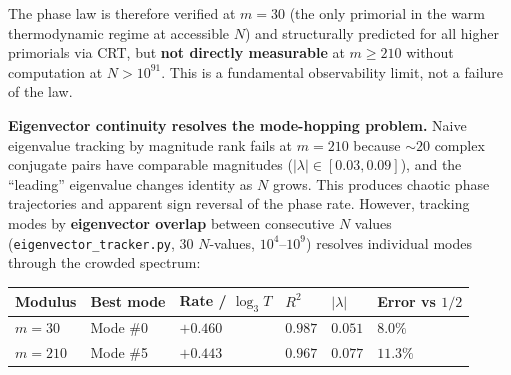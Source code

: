 \documentclass[
  11pt,
]{article}
\newcounter{none} %
\numberwithin{equation}{section}
\begin{document}
The phase law is therefore verified at \(m = 30\) (the only primorial in
the warm thermodynamic regime at accessible \(N\)) and structurally
predicted for all higher primorials via CRT, but \textbf{not directly
measurable} at \(m \geq 210\) without computation at \(N > 10^{91}\).
This is a fundamental observability limit, not a failure of the law.

\textbf{Eigenvector continuity resolves the mode-hopping problem.} Naive
eigenvalue tracking by magnitude rank fails at \(m = 210\) because
\(\sim 20\) complex conjugate pairs have comparable magnitudes
(\(|\lambda| \in [0.03, 0.09]\)), and the ``leading'' eigenvalue changes
identity as \(N\) grows. This produces chaotic phase trajectories and
apparent sign reversal of the phase rate. However, tracking modes by
\textbf{eigenvector overlap} between consecutive \(N\) values
(\texttt{eigenvector\_tracker.py}, 30 \(N\)-values, \(10^4\)--\(10^9\))
resolves individual modes through the crowded spectrum:

{\def\LTcaptype{none} %
\begin{longtable}[]{@{}
  >{\centering\arraybackslash}p{}
  >{\centering\arraybackslash}p{}
  >{\centering\arraybackslash}p{}
  >{\centering\arraybackslash}p{}
  >{\centering\arraybackslash}p{}
  >{\centering\arraybackslash}p{}@{}}
\toprule\noalign{}
\begin{minipage}[b]{\linewidth}\centering
Modulus
\end{minipage} & \begin{minipage}[b]{\linewidth}\centering
Best mode
\end{minipage} & \begin{minipage}[b]{\linewidth}\centering
Rate / \(\log_3 T\)
\end{minipage} & \begin{minipage}[b]{\linewidth}\centering
\(R^2\)
\end{minipage} & \begin{minipage}[b]{\linewidth}\centering
\(\lvert\lambda\rvert\)
\end{minipage} & \begin{minipage}[b]{\linewidth}\centering
Error vs \(1/2\)
\end{minipage} \\
\midrule\noalign{}
\endhead
\bottomrule\noalign{}
\endlastfoot
\(m = 30\) & Mode \#0 & \(+0.460\) & \(0.987\) & \(0.051\) &
\(8.0\%\) \\
\(m = 210\) & Mode \#5 & \(+0.443\) & \(0.967\) & \(0.077\) &
\(11.3\%\) \\
\end{longtable}
}
\end{document}
